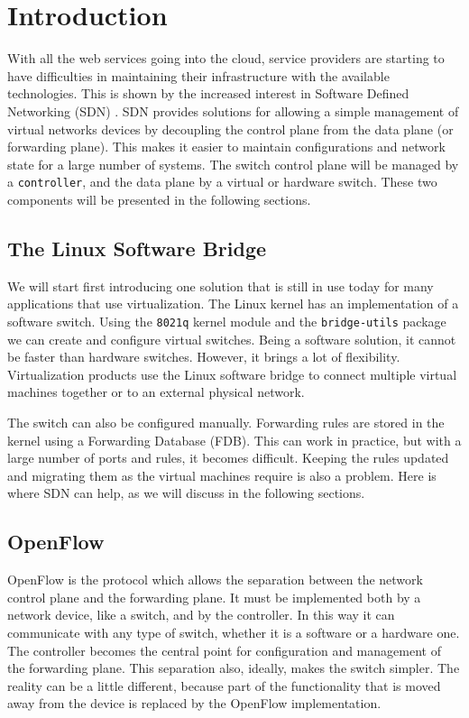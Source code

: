 \chapter{Introduction}
\label{chapter:intro}

With all the web services going into the cloud\cite{gartner}, service providers are starting to
have difficulties in maintaining their infrastructure with the available technologies.
This is shown by the increased interest in Software Defined Networking (SDN) \cite{sdn:whitepapers}.
SDN provides solutions for allowing a simple management of virtual networks devices by decoupling the control
plane from the data plane (or forwarding plane). This makes it easier to maintain configurations and network state
for a large number of systems. The switch control plane will be managed by a \texttt{controller},
and the data plane by a virtual or hardware switch. These two components will be presented in the following
sections.

\section{The Linux Software Bridge}
We will start first introducing one solution that is still in use today for many applications that use virtualization.
The Linux kernel has an implementation of a software switch. Using the \texttt{8021q} kernel module and the
\texttt{bridge-utils} package we can create and configure virtual switches. Being a software solution, it cannot
be faster than hardware switches. However, it brings a lot of flexibility. Virtualization products
use the Linux software bridge to connect multiple virtual machines together or to an external physical network.

The switch can also be configured manually. Forwarding rules are stored in the kernel using a Forwarding Database (FDB).
This can work in practice, but with a large number of ports and rules, it becomes difficult. Keeping the rules updated
and migrating them as the virtual machines require is also a problem. Here is where SDN can help, as we will discuss
in the following sections.

\section{OpenFlow}

OpenFlow is the protocol which allows the separation between the network control plane and the forwarding plane.
It must be implemented both by a network device, like a switch, and by the controller. In this way it 
can communicate with any type of switch, whether it is a software or a hardware one. The controller becomes
the central point for configuration and management of the forwarding plane. This separation also, ideally, makes the
switch simpler. The reality can be a little different, because part of the functionality that is moved away from
the device is replaced by the OpenFlow implementation.

